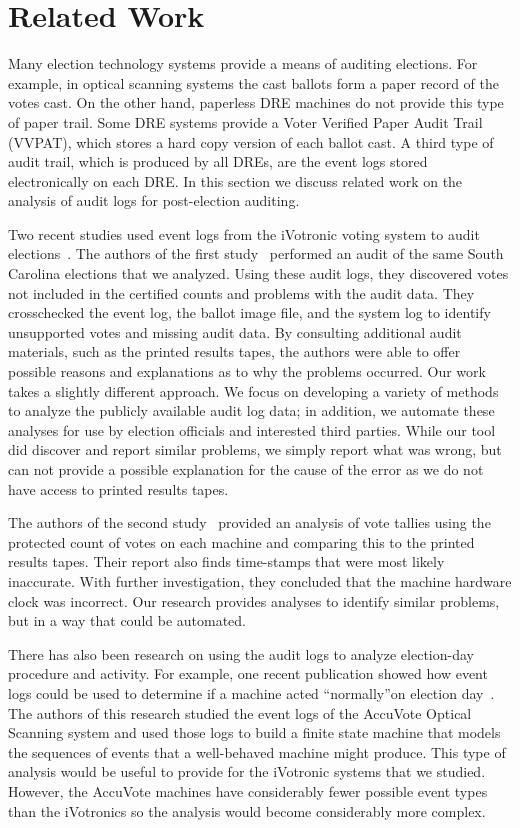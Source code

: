 \section{Related Work}
Many election technology systems provide a means of auditing elections. For example, in optical scanning systems the cast ballots form a paper record of the votes cast.  On the other hand, paperless DRE machines do not provide this type of paper trail. Some DRE systems provide a Voter Verified Paper Audit Trail (VVPAT), which stores a hard copy version of each ballot cast.  A third type of audit trail, which is produced by all DREs, are the event logs stored electronically on each DRE.  In this section we discuss related work on the analysis of audit logs for post-election auditing. 

Two recent studies used event logs from the iVotronic voting system to audit
elections~\cite{Buell2011,Sandler2007}. The authors of the first
study~\cite{Buell2011} performed an audit of the same South Carolina elections
that we analyzed. Using these audit logs, they discovered votes not included in
the certified counts and problems with the audit data. They crosschecked the
event log, the ballot image file, and the system log to identify unsupported
votes and missing audit data.  By consulting additional audit materials, such as
the printed results tapes, the authors were able to offer possible reasons and
explanations as to why the problems occurred. Our work takes a slightly
different approach.  We focus on developing a variety of methods to analyze the
publicly available audit log data; in addition, we automate these analyses for
use by election officials and interested third parties.  While our tool did
discover and report similar problems, we simply report what was wrong, but can
not provide a possible explanation for the cause of the error as we do not have
access to printed results tapes.  

The authors of the second study~\cite{Sandler2007} provided an analysis of vote tallies using the protected count of votes on each machine and comparing this to the printed results tapes. Their report also finds time-stamps that were most likely inaccurate.  With further investigation, they concluded that the machine hardware clock was incorrect. Our research provides analyses to identify similar problems, but in a way that could be automated. 

There has also been research on using the audit logs to analyze election-day procedure and activity. For example, one recent publication showed how event logs could be used to determine if a machine acted \textquotedblleft normally\textquotedblright on election day~\cite{Antonyan2009}. The authors of this research studied the event logs of the AccuVote Optical Scanning system and used those logs to build a finite state machine that models the sequences of events that a well-behaved machine might produce. This type of analysis would be useful to provide for the iVotronic systems that we studied. However, the AccuVote machines have considerably fewer possible event types than the iVotronics so the analysis would become considerably more complex. 

